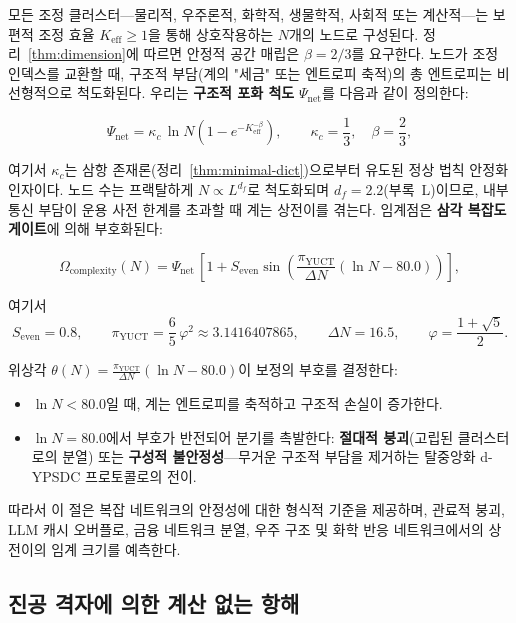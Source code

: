 \documentclass[12pt,a4paper]{article}
\theoremstyle{remark}
\newcommand{\Keff}{K_{\mathrm{eff}}}
\newcommand{\kappac}{\kappa_c}
\newcommand{\Seven}{S_{\mathrm{even}}}
\newcommand{\piYUCT}{\pi_{\mathrm{YUCT}}}
\begin{document}
	모든 조정 클러스터—물리적, 우주론적, 화학적, 생물학적, 사회적 또는 계산적—는 보편적 조정 효율 \(\Keff \ge 1\)을 통해 상호작용하는 \(N\)개의 노드로 구성된다. 정리~\ref{thm:dimension}에 따르면 안정적 공간 매립은 \(\beta = 2/3\)를 요구한다. 노드가 조정 인덱스를 교환할 때, 구조적 부담(계의 "세금" 또는 엔트로피 축적)의 총 엔트로피는 비선형적으로 척도화된다. 우리는 \textbf{구조적 포화 척도} \(\Psi_{\mathrm{net}}\)를 다음과 같이 정의한다:
	
	\begin{equation}
		\Psi_{\mathrm{net}} = \kappac \, \ln N \left(1 - e^{-\Keff^{-\beta}}\right),
		\qquad \kappac = \frac{1}{3},\quad \beta = \frac{2}{3},
		\label{eq:Psi_net}
	\end{equation}
	
	여기서 \(\kappac\)는 삼항 존재론(정리~\ref{thm:minimal-dict})으로부터 유도된 정상 법칙 안정화 인자이다. 노드 수는 프랙탈하게 \(N \propto L^{d_f}\)로 척도화되며 \(d_f = 2.2\)(부록~L)이므로, 내부 통신 부담이 운용 사전 한계를 초과할 때 계는 상전이를 겪는다. 임계점은 \textbf{삼각 복잡도 게이트}에 의해 부호화된다:
	
	\begin{equation}
		\Omega_{\mathrm{complexity}}(N) = \Psi_{\mathrm{net}} \,
		\left[1 + \Seven \sin\!\left( \frac{\piYUCT}{\Delta N} \left(\ln N - 80.0\right) \right) \right],
		\label{eq:Omega_complexity}
	\end{equation}
	
	여기서
	\[
	\Seven = 0.8,\qquad
	\piYUCT = \frac{6}{5}\,\varphi^2 \approx 3.1416407865,\qquad
	\Delta N = 16.5,\qquad
	\varphi = \frac{1+\sqrt{5}}{2}.
	\]
	
	위상각 \(\theta(N) = \frac{\piYUCT}{\Delta N} (\ln N - 80.0)\)이 보정의 부호를 결정한다:
	\begin{itemize}
		\item \(\ln N < 80.0\)일 때, 계는 엔트로피를 축적하고 구조적 손실이 증가한다.
		\item \(\ln N = 80.0\)에서 부호가 반전되어 분기를 촉발한다: \textbf{절대적 붕괴}(고립된 클러스터로의 분열) 또는 \textbf{구성적 불안정성}—무거운 구조적 부담을 제거하는 탈중앙화 d-YPSDC 프로토콜로의 전이.
	\end{itemize}
	
	따라서 이 절은 복잡 네트워크의 안정성에 대한 형식적 기준을 제공하며, 관료적 붕괴, LLM 캐시 오버플로, 금융 네트워크 분열, 우주 구조 및 화학 반응 네트워크에서의 상전이의 임계 크기를 예측한다.
	
	\subsection{진공 격자에 의한 계산 없는 항해}
	\label{subsec:computation-free}
	
\end{document}
